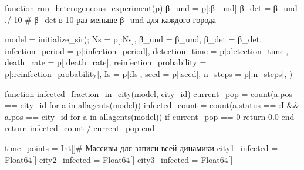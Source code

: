 \documentclass[
  12pt,
  a4paper,
  DIV=11,
  numbers=noendperiod]{scrreprt}
\newenvironment{Shaded}{\begin{snugshade}}{\end{snugshade}}
\newcommand{\CommentTok}[1]{\textcolor[rgb]{0.37,0.37,0.37}{#1}}
\newcommand{\ControlFlowTok}[1]{\textcolor[rgb]{0.00,0.23,0.31}{#1}}
\newcommand{\DataTypeTok}[1]{\textcolor[rgb]{0.68,0.00,0.00}{#1}}
\newcommand{\FloatTok}[1]{\textcolor[rgb]{0.68,0.00,0.00}{#1}}
\newcommand{\FunctionTok}[1]{\textcolor[rgb]{0.28,0.35,0.67}{#1}}
\newcommand{\KeywordTok}[1]{\textcolor[rgb]{0.00,0.23,0.31}{#1}}
\newcommand{\NormalTok}[1]{\textcolor[rgb]{0.00,0.23,0.31}{#1}}
\newcommand{\OperatorTok}[1]{\textcolor[rgb]{0.37,0.37,0.37}{#1}}
\begin{document}
\begin{Shaded}
\begin{Highlighting}[]
\KeywordTok{function} \FunctionTok{run\_heterogeneous\_experiment}\NormalTok{(p)}
\NormalTok{    β\_und }\OperatorTok{=}\NormalTok{ p[}\OperatorTok{:}\NormalTok{β\_und]}
\NormalTok{    β\_det }\OperatorTok{=}\NormalTok{ β\_und }\OperatorTok{./} \FloatTok{10}  \CommentTok{\# β\_det в 10 раз меньше β\_und для каждого города}

\NormalTok{    model }\OperatorTok{=} \FunctionTok{initialize\_sir}\NormalTok{(;}
\NormalTok{        Ns }\OperatorTok{=}\NormalTok{ p[}\OperatorTok{:}\NormalTok{Ns],}
\NormalTok{        β\_und }\OperatorTok{=}\NormalTok{ β\_und,}
\NormalTok{        β\_det }\OperatorTok{=}\NormalTok{ β\_det,}
\NormalTok{        infection\_period }\OperatorTok{=}\NormalTok{ p[}\OperatorTok{:}\NormalTok{infection\_period],}
\NormalTok{        detection\_time }\OperatorTok{=}\NormalTok{ p[}\OperatorTok{:}\NormalTok{detection\_time],}
\NormalTok{        death\_rate }\OperatorTok{=}\NormalTok{ p[}\OperatorTok{:}\NormalTok{death\_rate],}
\NormalTok{        reinfection\_probability }\OperatorTok{=}\NormalTok{ p[}\OperatorTok{:}\NormalTok{reinfection\_probability],}
\NormalTok{        Is }\OperatorTok{=}\NormalTok{ p[}\OperatorTok{:}\NormalTok{Is],}
\NormalTok{        seed }\OperatorTok{=}\NormalTok{ p[}\OperatorTok{:}\NormalTok{seed],}
\NormalTok{        n\_steps }\OperatorTok{=}\NormalTok{ p[}\OperatorTok{:}\NormalTok{n\_steps],}
\NormalTok{    )}

    \KeywordTok{function} \FunctionTok{infected\_fraction\_in\_city}\NormalTok{(model, city\_id)}
\NormalTok{        current\_pop }\OperatorTok{=} \FunctionTok{count}\NormalTok{(a.pos }\OperatorTok{==}\NormalTok{ city\_id }\ControlFlowTok{for}\NormalTok{ a }\KeywordTok{in} \FunctionTok{allagents}\NormalTok{(model))}
\NormalTok{        infected\_count }\OperatorTok{=} \FunctionTok{count}\NormalTok{(a.status }\OperatorTok{==} \OperatorTok{:}\NormalTok{I }\OperatorTok{\&\&}\NormalTok{ a.pos }\OperatorTok{==}\NormalTok{ city\_id }\ControlFlowTok{for}\NormalTok{ a }\KeywordTok{in} \FunctionTok{allagents}\NormalTok{(model))}
        \ControlFlowTok{if}\NormalTok{ current\_pop }\OperatorTok{==} \FloatTok{0}
            \ControlFlowTok{return} \FloatTok{0.0}
        \ControlFlowTok{end}
        \ControlFlowTok{return}\NormalTok{ infected\_count }\OperatorTok{/}\NormalTok{ current\_pop}
    \ControlFlowTok{end}

\NormalTok{    time\_points }\OperatorTok{=} \DataTypeTok{Int}\NormalTok{[]}\CommentTok{\# Массивы для записи всей динамики}
\NormalTok{    city1\_infected }\OperatorTok{=} \DataTypeTok{Float64}\NormalTok{[]}
\NormalTok{    city2\_infected }\OperatorTok{=} \DataTypeTok{Float64}\NormalTok{[]}
\NormalTok{    city3\_infected }\OperatorTok{=} \DataTypeTok{Float64}\NormalTok{[]}


\end{Highlighting}
\end{Shaded}
\end{document}
